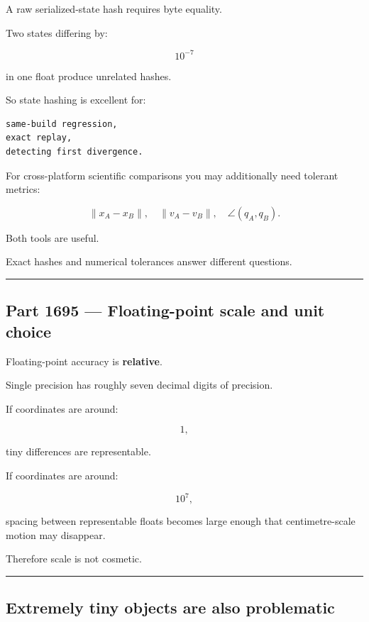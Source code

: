 A raw serialized-state hash requires byte equality.

Two states differing by:

\[
10^{-7}
\]

in one float produce unrelated hashes.

So state hashing is excellent for:

\begin{verbatim}
same-build regression,
exact replay,
detecting first divergence.
\end{verbatim}

For cross-platform scientific comparisons you may additionally need tolerant metrics:

\[
\|x_A-x_B\|,
\quad
\|v_A-v_B\|,
\quad
\angle(q_A,q_B).
\]

Both tools are useful.

Exact hashes and numerical tolerances answer different questions.

\begin{center}\rule{0.5\linewidth}{0.5pt}\end{center}

\subsection{Part 1695 --- Floating-point scale and unit choice}\label{06-engine-ii-ch039-part-1695-floating-point-scale-and-unit-choice}

Floating-point accuracy is \textbf{relative}.

Single precision has roughly seven decimal digits of precision.

If coordinates are around:

\[
1,
\]

tiny differences are representable.

If coordinates are around:

\[
10^7,
\]

spacing between representable floats becomes large enough that centimetre-scale motion may disappear.

Therefore scale is not cosmetic.

\begin{center}\rule{0.5\linewidth}{0.5pt}\end{center}

\subsection{Extremely tiny objects are also problematic}\label{06-engine-ii-ch039-extremely-tiny-objects-are-also-problematic}

